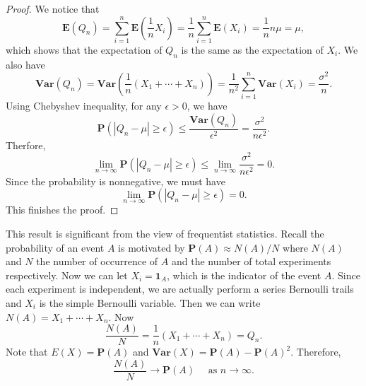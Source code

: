 \begin{proof}
We notice that 
\begin{equation*}
    \mathbf{E}(Q_n) = \sum_{i=1}^n \mathbf{E}\left( \frac{1}{n} X_i \right) = \frac{1}{n} \sum_{i=1}^n \mathbf{E}(X_i) = \frac{1}{n} n\mu = \mu,
\end{equation*}
which shows that the expectation of $Q_n$ is the same as the expectation of $X_i$. We also have
\begin{equation*}
    \mathbf{Var}(Q_n) = \mathbf{Var} \left( \frac{1}{n} \left(X_1 + \cdots + X_n \right) \right) = \frac{1}{n^2} \sum_{i=1}^n \mathbf{Var}(X_i) = \frac{\sigma^2}{n}.
\end{equation*}
Using Chebyshev inequality, for any $\epsilon > 0$, we have
\begin{equation*}
    \mathbf{P}(\left\vert Q_n-\mu \right\vert\geq \epsilon) \leq \frac{\mathbf{Var}(Q_n)}{\epsilon^2} = \frac{\sigma^2}{n\epsilon^2}.
\end{equation*}
Therfore,
\begin{equation*}
    \lim_{n\to\infty} \mathbf{P}(\left\vert Q_n-\mu \right\vert\geq \epsilon) \leq \lim_{n\to\infty} \frac{\sigma^2}{n\epsilon^2} = 0.
\end{equation*}
Since the probability is nonnegative, we must have
\begin{equation*}
    \lim_{n\to\infty} \mathbf{P}(\left\vert Q_n-\mu \right\vert\geq \epsilon) = 0.
\end{equation*}
This finishes the proof.
\end{proof}

This result is significant from the view of frequentist statistics. Recall the probability of an event $A$ is motivated by $\mathbf{P}(A) \approx N(A) / N$ where $N(A)$ and $N$ the number of occurrence of $A$ and the number of total experiments respectively. Now we can let $X_i = \mathbf{1}_A$, which is the indicator of the event $A$. Since each experiment is independent, we are actually perform a series Bernoulli trails and $X_i$ is the simple Bernoulli variable. Then we can write $N(A) = X_1 + \cdots + X_n$. Now 
\begin{equation*}
    \frac{N(A)}{N} = \frac{1}{n} \left( X_1 + \cdots + X_n \right) = Q_n.
\end{equation*}
Note that $E(X) = \mathbf{P}(A)$ and $\mathbf{Var}(X) = \mathbf{P}(A) - \mathbf{P}(A)^2$. Therefore, 
\begin{equation*}
    \frac{N(A)}{N} \to \mathbf{P}(A) \quad \text{ as } n\to\infty.
\end{equation*}

